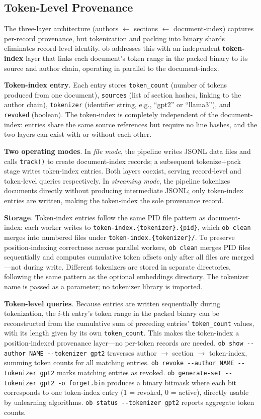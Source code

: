 \subsection{Token-Level Provenance}

The three-layer architecture (authors $\leftarrow$ sections $\leftarrow$ document-index) captures per-record provenance, but tokenization and packing into binary shards eliminates record-level identity. ob addresses this with an independent \textbf{token-index} layer that links each document's token range in the packed binary to its source and author chain, operating in parallel to the document-index.

\textbf{Token-index entry}. Each entry stores \texttt{token\_count} (number of tokens produced from one document), \texttt{sources} (list of section hashes, linking to the author chain), \texttt{tokenizer} (identifier string, e.g., ``gpt2'' or ``llama3''), and \texttt{revoked} (boolean). The token-index is completely independent of the document-index: entries share the same source references but require no line hashes, and the two layers can exist with or without each other.

\textbf{Two operating modes}. In \emph{file mode}, the pipeline writes JSONL data files and calls \texttt{track()} to create document-index records; a subsequent tokenize+pack stage writes token-index entries. Both layers coexist, serving record-level and token-level queries respectively. In \emph{streaming mode}, the pipeline tokenizes documents directly without producing intermediate JSONL; only token-index entries are written, making the token-index the sole provenance record.

\textbf{Storage}. Token-index entries follow the same PID file pattern as document-index: each worker writes to \texttt{token-index.\{tokenizer\}.\{pid\}}, which \texttt{ob clean} merges into numbered files under \texttt{token-index.\{tokenizer\}/}. To preserve position-indexing correctness across parallel workers, \texttt{ob clean} merges PID files sequentially and computes cumulative token offsets only after all files are merged---not during write. Different tokenizers are stored in separate directories, following the same pattern as the optional embeddings directory. The tokenizer name is passed as a parameter; no tokenizer library is imported.

\textbf{Token-level queries}. Because entries are written sequentially during tokenization, the $i$-th entry's token range in the packed binary can be reconstructed from the cumulative sum of preceding entries' \texttt{token\_count} values, with its length given by its own \texttt{token\_count}. This makes the token-index a position-indexed provenance layer---no per-token records are needed. \texttt{ob show -{}-author NAME -{}-tokenizer gpt2} traverses author $\rightarrow$ section $\rightarrow$ token-index, summing token counts for all matching entries. \texttt{ob revoke -{}-author NAME -{}-tokenizer gpt2} marks matching entries as revoked. \texttt{ob generate-set -{}-tokenizer gpt2 -o forget.bin} produces a binary bitmask where each bit corresponds to one token-index entry (1 = revoked, 0 = active), directly usable by unlearning algorithms. \texttt{ob status -{}-tokenizer gpt2} reports aggregate token counts.

